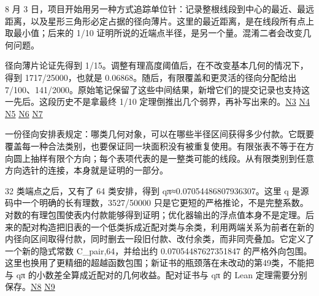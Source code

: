 8 月 3 日，项目开始用另一种方式追踪单位针：记录整根线段到中心的最近、最远距离，以及星形三角形必定占据的径向薄片。这里的最近距离，是在线段所有点上取最小值；后来的 1/10 证明所说的近端点半径，是另一个量。混淆二者会改变几何问题。

径向薄片论证先得到 1/15。调整有理高度阈值后，在不改变基本几何的情况下，得到 1717/25000，也就是 \allowbreak{}0.06868。随后，有限覆盖和更灵活的径向分配给出 7/100、141/2000。原始笔记保留了这些中间结果，新增它们的提交记录也支持这一先后。这段历史不是拿最终 1/10 定理倒推出几个弱界，再补写出来的。\href{https://github.com/subfish-zhou/star-shaped-kakeya-lean/blob/6432d8eb33cc2093ed5ca1f5e63390e4bf065fd0/history/002-endpoint-capacity/UNIVERSAL-ONE-FIFTEENTH.md}{N3} \href{https://github.com/subfish-zhou/star-shaped-kakeya-lean/blob/6432d8eb33cc2093ed5ca1f5e63390e4bf065fd0/history/002-endpoint-capacity/UNIVERSAL-OPTIMIZED.md}{N4} \href{https://github.com/subfish-zhou/star-shaped-kakeya-lean/blob/6432d8eb33cc2093ed5ca1f5e63390e4bf065fd0/history/002-endpoint-capacity/UNIVERSAL-SEVEN-HUNDREDTHS.md}{N5} \href{https://github.com/subfish-zhou/star-shaped-kakeya-lean/blob/6432d8eb33cc2093ed5ca1f5e63390e4bf065fd0/history/002-endpoint-capacity/UNIVERSAL-141-OVER-2000.md}{N6} \href{https://github.com/subfish-zhou/star-shaped-kakeya-lean/blob/6432d8eb33cc2093ed5ca1f5e63390e4bf065fd0/history/002-endpoint-capacity/README.md}{N7}

一份径向安排表规定：哪类几何对象，可以在哪些半径区间获得多少付款。它既要覆盖每一种合法类别，也要保证同一块面积没有被重复使用。有限张表不等于在方向圆上抽样有限个方向；每个表项代表的是一整类可能的线段。从有限类别到任意方向选针的连接，本身就是证明的一部分。

32 类端点之后，又有了 64 类安排，得到 qπ≈\allowbreak{}0.07054486807936307。这里 q 是源码中一个明确的长有理数，3527/50000 只是它更短的严格推论，不是完整系数。对数的有理包围使表内付款能够得到证明；优化器输出的浮点值本身不是定理。后来的配对构造把旧表的一个低类拆成近配对类与余类，利用两端关系为前者在新的内径向区间取得付款，同时删去一段旧付款、改付余类，而非同壳叠加。它定义了一个新的隐式常数 C\_pair,64，并给出约 \allowbreak{}0.07054487627351847 的严格外向包围。这里也换用了更精细的超越函数包围；新证书的瓶颈落在未改动的第49类，不能把与 qπ 的小数差全算成近配对的几何收益。配对证书与 qπ 的 Lean 定理需要分别保存。\href{https://github.com/subfish-zhou/star-shaped-kakeya-lean/blob/6432d8eb33cc2093ed5ca1f5e63390e4bf065fd0/history-sources/N8-README.md}{N8} \href{https://github.com/subfish-zhou/star-shaped-kakeya-lean/blob/6432d8eb33cc2093ed5ca1f5e63390e4bf065fd0/history-sources/N9-THEOREM.md}{N9}

